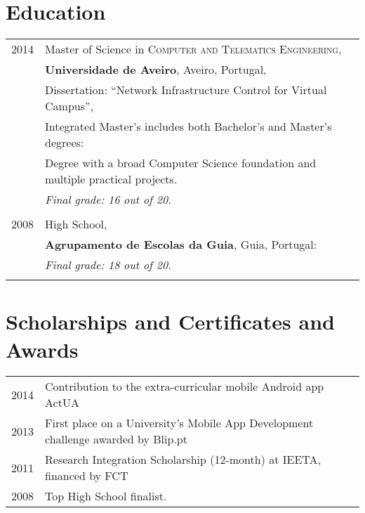 \documentclass[letter,10pt]{article} %
\begin{document}

\section{Education}

\begin{tabular}{rl}	
\textsc{2014} & Master of Science in \textsc{Computer and Telematics Engineering}, \\
&\textbf{Universidade de Aveiro}, Aveiro, Portugal, \\
& Dissertation: ``Network Infrastructure Control for Virtual Campus'', \\
& Integrated Master's includes both Bachelor's and Master's degrees: \\
& Degree with a broad Computer Science foundation and multiple practical projects.\\
& \textit{Final grade: 16 out of 20.}\\
&\\

\textsc{2008} & High School, \\
&\textbf{Agrupamento de Escolas da Guia}, Guia, Portugal: \\
& \textit{Final grade: 18 out of 20.}\\
&\\
\end{tabular}


\section{Scholarships and Certificates and Awards}

\begin{tabular}{rl}
\textsc{2014} & Contribution to the extra-curricular mobile Android app ActUA \normalsize\\
\textsc{2013} & First place on a University's Mobile App Development challenge awarded by Blip.pt \normalsize\\
\textsc{2011} & Research Integration Scholarship (12-month) at IEETA, financed by FCT \normalsize\\
\textsc{2008} & Top High School finalist. \normalsize\\
\end{tabular} \\
\end{document}
